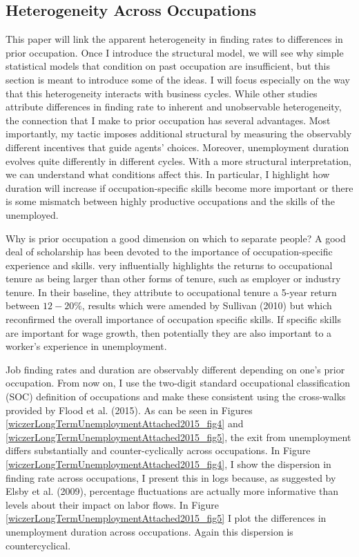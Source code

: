 \documentclass[12pt]{article}
\newcommand{\highlightP}[1]{{\emph{\color{MyPink}{#1}}}}
\theoremstyle{definition}
\begin{document}
\subsection{Heterogeneity Across Occupations}

This paper will link the apparent heterogeneity in finding rates to differences in prior occupation. Once I introduce the structural model, we will see why simple statistical models that condition on past occupation are insufficient, but this section is meant to introduce some of the ideas. I will focus especially on the way that this heterogeneity interacts with business cycles. While other studies attribute differences in finding rate to inherent and unobservable heterogeneity, the connection that I make to prior occupation has several advantages. Most importantly, my tactic imposes additional structural by measuring the observably different incentives that guide agents' choices. \highlightP{If observed dispersion in finding rate is due to attachment to one's prior occupation, then this heterogeneity cannot be summarized by some arbitrary factors that are assumed to be policy neutral.} Moreover, unemployment duration evolves quite differently in different cycles. With a more structural interpretation, we can understand what conditions affect this. In particular, I highlight how duration will increase if occupation-specific skills become more important or there is some mismatch between highly productive occupations and the skills of the unemployed. 

Why is prior occupation a good dimension on which to separate people? A good deal of scholarship has been devoted to the importance of occupation-specific experience and skills. \citet{kambourovOccupationalSpecificityHuman2009} very influentially highlights the returns to occupational tenure as being larger than other forms of tenure, such as employer or industry tenure. In their baseline, they attribute to occupational tenure a 5-year return between $12-20\%$, results  which were amended by Sullivan (2010) but which reconfirmed the overall importance of occupation specific skills. If specific skills are important for wage growth, then potentially they are also important to a worker's experience in unemployment.

Job finding rates and duration are observably different depending on one's prior occupation. From now on, I use the two-digit standard occupational classification (SOC) definition of occupations and make these consistent using the cross-walks provided by Flood et al.  (2015). As can be seen in Figures \ref{wiczerLongTermUnemploymentAttached2015_fig4} and \ref{wiczerLongTermUnemploymentAttached2015_fig5}, the exit from unemployment differs substantially and counter-cyclically across occupations. In Figure \ref{wiczerLongTermUnemploymentAttached2015_fig4}, I show the dispersion in finding rate across occupations, I present this in logs because, as suggested by Elsby et al. (2009), percentage fluctuations are actually more informative than levels about their impact on labor flows. In Figure \ref{wiczerLongTermUnemploymentAttached2015_fig5} I plot the differences in unemployment duration across occupations. Again this dispersion is countercyclical.
\end{document}
